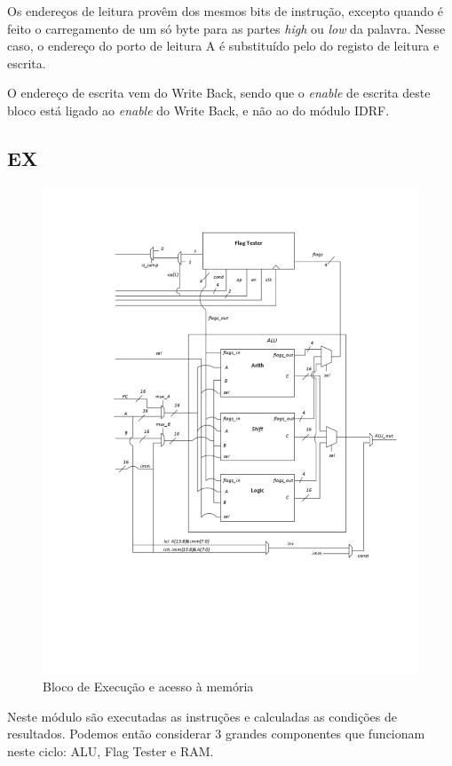 \documentclass[a4paper]{article}
\begin{document}
				Os endereços de leitura provêm dos mesmos bits de instrução, excepto quando é feito o carregamento de um só byte para as partes \textit{high} ou \textit{low} da palavra. Nesse caso, o endereço do porto de leitura A é substituído pelo do registo de leitura e escrita.
				
				O endereço de escrita vem do Write Back, sendo que o \textit{enable} de escrita deste bloco está ligado ao \textit{enable} do Write Back, e não ao do módulo IDRF.
			
		\subsection{EX}
		
			\begin{figure}[H]
				\centering	
				\includegraphics[width=\textwidth]{ex}
				\caption{Bloco de Execução e acesso à memória}
				\label{fig:ex}
			\end{figure}
		
			Neste módulo são executadas as instruções e calculadas as condições de resultados. Podemos então considerar 3 grandes componentes que funcionam neste ciclo: ALU, Flag Tester e RAM.
			
\end{document}
